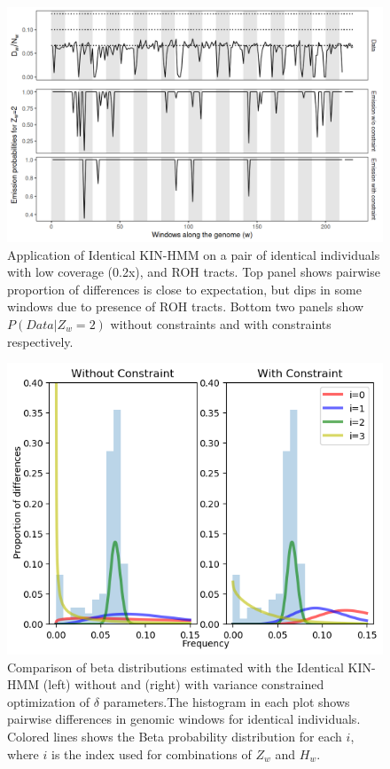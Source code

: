 \documentclass[12pt, letterpaper]{article}
\begin{document}
\begin{figure}[h!]
    \includegraphics[width=18cm]{supplementary_info/plots/contam0_inbred1_run57_coverage0.2_asc0_inputMode_hapProbs_fil0_pair0_15_relid_emissions_bnds.png}
    \centering
    \caption{Application of Identical KIN-HMM on a pair of identical individuals with low coverage (0.2x), and ROH tracts. Top panel shows pairwise proportion of differences is close to expectation, but dips in some windows due to presence of ROH tracts. Bottom two panels show $P(Data|Z_w=2)$ without constraints and with constraints respectively.}
    \label{figS3:bnds}
\end{figure}



\begin{figure}[h!]
    \includegraphics[width=18cm]{supplementary_info/plots/contam0_inbred1_run57_coverage0.2_asc0_inputMode_hapProbs_fil0_pair0_15_relid_betaplot.png}
    \centering
    \caption{Comparison of beta distributions estimated with the Identical KIN-HMM (left) without and (right) with variance constrained optimization of $\delta$ parameters.The histogram in each plot shows pairwise differences in genomic windows for identical individuals. Colored lines shows the Beta probability distribution for each $i$, where $i$ is the index used for combinations of $Z_w$ and $H_w$.}
    \label{figS4:bndsbeta}
\end{figure}
\end{document}
